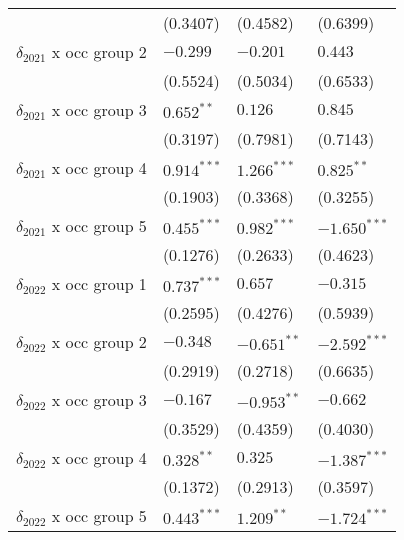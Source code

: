 \begin{tabular}{llll}
                                         &           (0.3407) &           (0.4582) &           (0.6399) \\
$\delta_{2021}$ x occ group 2            &           $-0.299$ &           $-0.201$ &            $0.443$ \\
                                         &           (0.5524) &           (0.5034) &           (0.6533) \\
$\delta_{2021}$ x occ group 3            &       $0.652^{**}$ &            $0.126$ &            $0.845$ \\
                                         &           (0.3197) &           (0.7981) &           (0.7143) \\
$\delta_{2021}$ x occ group 4            &      $0.914^{***}$ &      $1.266^{***}$ &       $0.825^{**}$ \\
                                         &           (0.1903) &           (0.3368) &           (0.3255) \\
$\delta_{2021}$ x occ group 5            &      $0.455^{***}$ &      $0.982^{***}$ &     $-1.650^{***}$ \\
                                         &           (0.1276) &           (0.2633) &           (0.4623) \\
$\delta_{2022}$ x occ group 1            &      $0.737^{***}$ &            $0.657$ &           $-0.315$ \\
                                         &           (0.2595) &           (0.4276) &           (0.5939) \\
$\delta_{2022}$ x occ group 2            &           $-0.348$ &      $-0.651^{**}$ &     $-2.592^{***}$ \\
                                         &           (0.2919) &           (0.2718) &           (0.6635) \\
$\delta_{2022}$ x occ group 3            &           $-0.167$ &      $-0.953^{**}$ &           $-0.662$ \\
                                         &           (0.3529) &           (0.4359) &           (0.4030) \\
$\delta_{2022}$ x occ group 4            &       $0.328^{**}$ &            $0.325$ &     $-1.387^{***}$ \\
                                         &           (0.1372) &           (0.2913) &           (0.3597) \\
$\delta_{2022}$ x occ group 5            &      $0.443^{***}$ &       $1.209^{**}$ &     $-1.724^{***}$ \\

\end{tabular}
